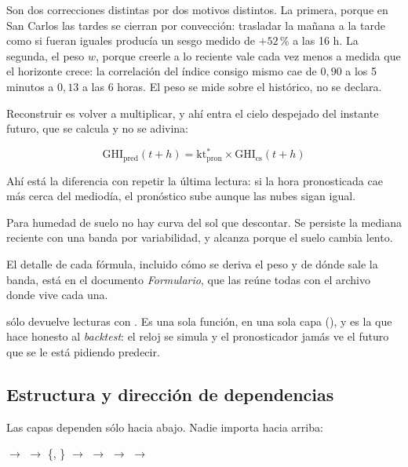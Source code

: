 Son dos correcciones distintas por dos motivos distintos. La primera, porque en San Carlos
las tardes se cierran por convección: trasladar la mañana a la tarde como si fueran iguales
producía un sesgo medido de $+52$\,\% a las 16 h. La segunda, el peso $w$, porque creerle
a lo reciente vale cada vez menos a medida que el horizonte crece: la correlación del
índice consigo mismo cae de $0{,}90$ a los 5 minutos a $0{,}13$ a las 6 horas. El peso se
mide sobre el histórico, no se declara.

Reconstruir es volver a multiplicar, y ahí entra el cielo despejado del instante futuro,
que se calcula y no se adivina:

\begin{equation*}
  \mathrm{GHI_{pred}}(t+h) = \mathrm{kt^*_{pron}} \times \mathrm{GHI_{cs}}(t+h)
\end{equation*}

Ahí está la diferencia con repetir la última lectura: si la hora pronosticada cae más cerca
del mediodía, el pronóstico sube aunque las nubes sigan igual.

Para humedad de suelo no hay curva del sol que descontar. Se persiste la mediana reciente
con una banda por variabilidad, y alcanza porque el suelo cambia lento.

El detalle de cada fórmula, incluido cómo se deriva el peso y de dónde sale la banda, está
en el documento \emph{Formulario}, que las reúne todas con el archivo donde vive cada una.

\begin{aviso}[title=Barrera anti-fuga]
 sólo devuelve lecturas con .
Es una sola función, en una sola capa (), y es la que hace honesto al
\emph{backtest}: el reloj se simula y el pronosticador jamás ve el futuro que se le está
pidiendo predecir.
\end{aviso}

\subsection{Estructura y dirección de dependencias}

Las capas dependen sólo hacia abajo. Nadie importa hacia arriba:

\begin{center}
 $\to$  $\to$ \{, \} $\to$
 $\to$  $\to$  $\to$ 
\end{center}


